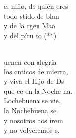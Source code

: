 \documentclass[12pt]{article}
\begin{document}
\begin{multicols*}{2}
\begin{cancion}%
	\begin{chorus}%
	e, niño, de quién eres\\
	todo stido de blan\\
	y de la rgen Maa\\
	y del píru to (**)\\
	\end{chorus}%
	\jump\\
	uenen con alegría\\
	los cnticos de mierra,\\
	y viva el Hijo de Ds\\
	que ce en la Noche na.\\
	Lochebuena se vie,\\
	la Nochebuena se \\
	y nosotros nos irem\\
	y no volveremos s.\\
\end{cancion}%


\end{multicols*}
\end{document}
